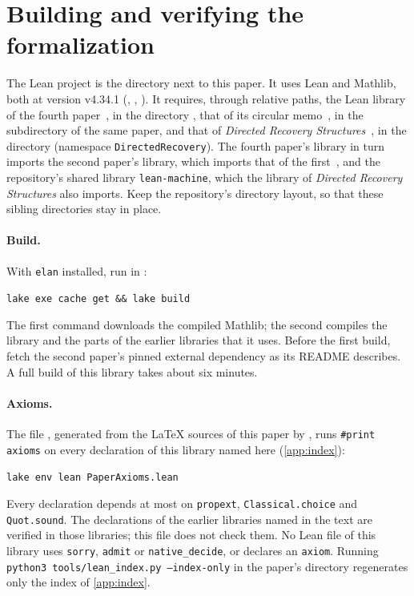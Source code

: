 \section{Building and verifying the formalization}\label{app:verify}

The Lean project is the directory  next to this paper. It uses Lean and Mathlib, both at version v4.34.1
(, , ). It requires, through relative paths,
the Lean library of the fourth paper~\cite{FourthPaper2026}, in the directory
, that of its circular
memo~\cite{CircularMemo2026}, in the subdirectory  of the same paper, and that of \emph{Directed Recovery
Structures}~\cite{DirectedRecovery2026}, in the directory 
(namespace \texttt{DirectedRecovery}). The fourth paper's library in turn imports the second paper's library, which imports
that of the first~\cite{FirstPaper2026,SecondPaper2026}, and the repository's shared library \texttt{lean-machine}, which
the library of \emph{Directed Recovery Structures} also imports. Keep the repository's directory layout, so that these
sibling directories stay in place.

\paragraph{Build.} With \texttt{elan} installed, run in :
\begin{center}
\texttt{lake exe cache get \&\& lake build}
\end{center}
The first command downloads the compiled Mathlib; the second compiles the library and the parts of the earlier libraries
that it uses. Before the first build, fetch the second paper's pinned external dependency as its README describes. A
full build of this library takes about six minutes.

\paragraph{Axioms.} The file , generated from the \LaTeX{} sources of this paper by
, runs \texttt{\#print axioms} on every declaration of this library named here
(\cref{app:index}):
\begin{center}
\texttt{lake env lean PaperAxioms.lean}
\end{center}
Every declaration depends at most on \texttt{propext}, \texttt{Classical.choice} and \texttt{Quot.sound}. The declarations
of the earlier libraries named in the text are verified in those libraries; this file does not check them. No Lean file
of this library uses \texttt{sorry}, \texttt{admit} or \texttt{native\_decide}, or declares an \texttt{axiom}. Running
\texttt{python3 tools/lean\_index.py --index-only} in the paper's directory regenerates only the index of
\cref{app:index}.

